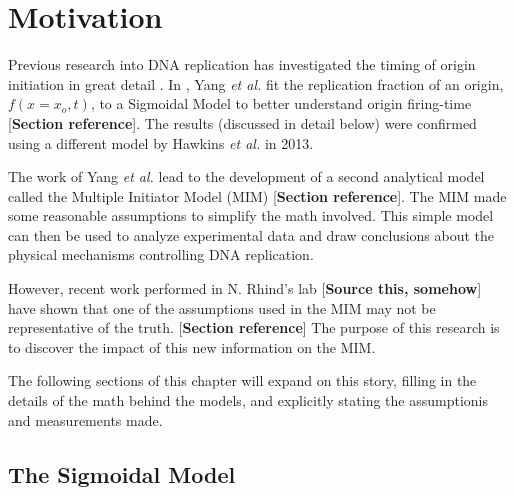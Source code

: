 \chapter{Motivation}
\label{ch:Motivation}

Previous research into DNA replication has investigated the timing of origin initiation in great detail \cite{ScottsPaper,StochasticTermination}.
In \cite{ScottsPaper}, Yang \emph{et al.} fit the replication fraction of an origin, $f(x=x_o,t)$, to a Sigmoidal Model to better understand origin firing-time [\textbf{Section reference}].
The results (discussed in detail below) were confirmed using a different model by Hawkins \emph{et al.} \cite{StochasticTermination} in 2013.

The work of Yang \emph{et al.} lead to the development of a second analytical model called the Multiple Initiator Model (MIM) [\textbf{Section reference}].
The MIM made some reasonable assumptions to simplify the math involved.
This simple model can then be used to analyze experimental data and draw conclusions about the physical mechanisms controlling DNA replication.

However, recent work performed in N. Rhind's lab [\textbf{Source this, somehow}] have shown that one of the assumptions used in the MIM may not be representative of the truth. [\textbf{Section reference}]
The purpose of this research is to discover the impact of this new information on the MIM.

The following sections of this chapter will expand on this story, filling in the details of the math behind the models, and explicitly stating the assumptionis and measurements made.


	\section{The Sigmoidal Model}
	\label{sec:SigmoidalModel}
	
	